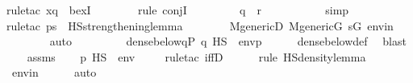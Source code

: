 \begin{isabellebody}
{\isacharparenleft}{\kern0pt}rule{\isacharunderscore}{\kern0pt}tac\ x{\isacharequal}{\kern0pt}q\ \ bexI{\isacharparenright}{\kern0pt}\isanewline
\ \ \ \ \ \ \ \isamarkupfalse%
{\isacharparenleft}{\kern0pt}rule\ conjI{\isacharparenright}{\kern0pt}\ \isanewline
\ \ \ \ \ \ \isamarkupfalse%
\ {\isacartoucheopen}q\ {\isasympreceq}\ r{\isacartoucheclose}\ \isanewline
\ \ \ \ \ \ \ \ \isamarkupfalse%
\ simp\isanewline
\ \ \ \ \ \ \ \isamarkupfalse%
{\isacharparenleft}{\kern0pt}rule{\isacharunderscore}{\kern0pt}tac\ p{\isacharequal}{\kern0pt}s\ \ HS{\isacharunderscore}{\kern0pt}strengthening{\isacharunderscore}{\kern0pt}lemma{\isacharparenright}{\kern0pt}\isanewline
\ \ \ \ \ \ \isamarkupfalse%
\ M{\isacharunderscore}{\kern0pt}genericD\ {\isacartoucheopen}M{\isacharunderscore}{\kern0pt}generic{\isacharparenleft}{\kern0pt}G{\isacharparenright}{\kern0pt}{\isacartoucheclose}\ {\isacartoucheopen}s{\isasymin}G{\isacartoucheclose}\ envin\ \isanewline
\ \ \ \ \ \ \isamarkupfalse%
\ auto\isanewline
\ \ \isacommand{{\isacharbraceright}{\kern0pt}}\isamarkupfalse%
\isanewline
\ \ \isamarkupfalse%
\isanewline
\ \ \isamarkupfalse%
\ {\isachardoublequoteopen}dense{\isacharunderscore}{\kern0pt}below{\isacharparenleft}{\kern0pt}{\isacharbraceleft}{\kern0pt}q{\isasymin}P{\isachardot}{\kern0pt}\ {\isacharparenleft}{\kern0pt}q\ {\isasymtturnstile}HS\ {\isasymphi}\ env{\isacharparenright}{\kern0pt}{\isacharbraceright}{\kern0pt}{\isacharcomma}{\kern0pt}p{\isacharparenright}{\kern0pt}{\isachardoublequoteclose}\isanewline
\ \ \ \ \isamarkupfalse%
\ dense{\isacharunderscore}{\kern0pt}below{\isacharunderscore}{\kern0pt}def\ \isamarkupfalse%
\ blast\isanewline
\ \ \isamarkupfalse%
\ assms\isanewline
\ \ \isamarkupfalse%
\ {\isachardoublequoteopen}{\isacharparenleft}{\kern0pt}p\ {\isasymtturnstile}HS\ {\isasymphi}\ env{\isacharparenright}{\kern0pt}{\isachardoublequoteclose}\isanewline
\ \ \ \ \isamarkupfalse%
{\isacharparenleft}{\kern0pt}rule{\isacharunderscore}{\kern0pt}tac\ iffD{}{\isacharparenright}{\kern0pt}\isanewline
\ \ \ \ \ \isamarkupfalse%
{\isacharparenleft}{\kern0pt}rule\ HS{\isacharunderscore}{\kern0pt}density{\isacharunderscore}{\kern0pt}lemma{\isacharparenright}{\kern0pt}\ \isanewline
\ \ \ \ \isamarkupfalse%
\ envin\isanewline
\ \ \ \ \isamarkupfalse%
\ auto\isanewline
{}\isamarkupfalse%
%
\endisatagproof
{\isafoldproof}%
%
\isadelimproof
\isanewline
%
\endisadelimproof
\isanewline
\isanewline
{}\isamarkupfalse%
\isanewline
%
\isadelimtheory
%
\endisadelimtheory
%
\isatagtheory
{}\isamarkupfalse%
%
\endisatagtheory
{\isafoldtheory}%
%
\isadelimtheory
%
\endisadelimtheory
%
\end{isabellebody}%
